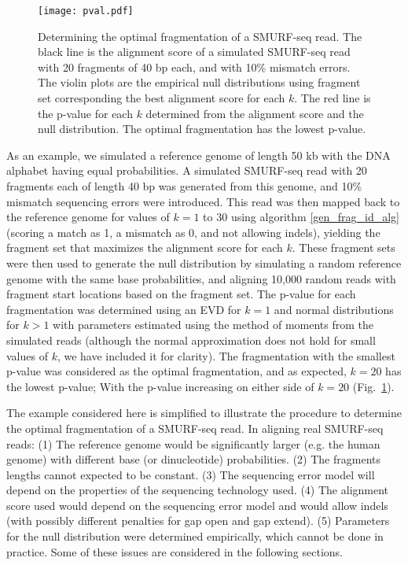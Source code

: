 \begin{figure}[t!]
\centering
\texttt{[image: pval.pdf]}
\caption[Determining the optimal fragmentation of a SMURF-seq read]{
  Determining the optimal fragmentation of a SMURF-seq read. The black
  line is the alignment score of a simulated SMURF-seq read with 20
  fragments of 40 bp each, and with 10\% mismatch errors. The violin plots
  are the empirical null distributions using fragment set corresponding
  the best alignment score for each $k$. The red line is the p-value for
  each $k$ determined from the alignment score and the null distribution.
  The optimal fragmentation has the lowest p-value.}
\label{pval_calc}
\end{figure}

As an example, we simulated a reference genome of length 50 kb with the
DNA alphabet having equal probabilities.
%
A simulated SMURF-seq read with 20 fragments each of length 40 bp was
generated from this genome, and 10\% mismatch sequencing errors were
introduced.
%
This read was then mapped back to the reference genome for values of $k
= 1$ to $30$ using algorithm \ref{gen_frag_id_alg} (scoring a match as
1, a mismatch as 0, and not allowing indels), yielding the fragment set
that maximizes the alignment score for each $k$.
%
These fragment sets were then used to generate the null distribution by
simulating a random reference genome with the same base probabilities,
and aligning 10,000 random reads with fragment start locations based on
the fragment set.
%
The p-value for each fragmentation was determined using an EVD for $k=1$
and normal distributions for $k > 1$ with parameters estimated using the
method of moments from the simulated reads (although the normal
approximation does not hold for small values of $k$, we have included it
for clarity).
%
The fragmentation with the smallest p-value was considered as the
optimal fragmentation, and as expected, $k = 20$ has the lowest p-value;
With the p-value increasing on either side of $k = 20$
(Fig.~\ref{pval_calc}).

The example considered here is simplified to illustrate the procedure
to determine the optimal fragmentation of a SMURF-seq read. In aligning
real SMURF-seq reads: (1) The reference genome would be significantly
larger (e.g. the human genome) with different base (or dinucleotide)
probabilities. (2) The fragments lengths cannot expected to be constant.
(3) The sequencing error model will depend on the properties of the
sequencing technology used. (4) The alignment score used would depend on
the sequencing error model and would allow indels (with possibly
different penalties for gap open and gap extend). (5) Parameters for the
null distribution were determined empirically, which cannot be done in
practice. Some of these issues are considered in the following sections.

